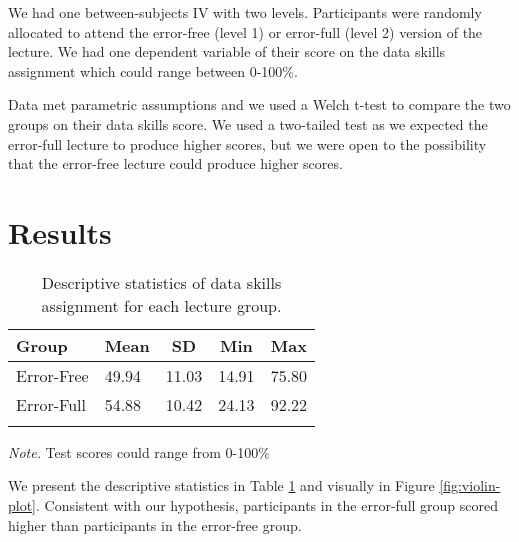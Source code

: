 \documentclass[
  man,floatsintext]{apa6}
\begin{document}
We had one between-subjects IV with two levels. Participants were randomly allocated to attend the error-free (level 1) or error-full (level 2) version of the lecture. We had one dependent variable of their score on the data skills assignment which could range between 0-100\%.

Data met parametric assumptions and we used a Welch t-test to compare the two groups on their data skills score. We used a two-tailed test as we expected the error-full lecture to produce higher scores, but we were open to the possibility that the error-free lecture could produce higher scores.

\hypertarget{results}{%
\section{Results}\label{results}}

\begin{table}[tbp]

\begin{center}
\begin{threeparttable}

\caption{\label{tab:descriptives-table}Descriptive statistics of data skills assignment for each lecture group.}

\begin{tabular}{lllll}
\toprule
Group & \multicolumn{1}{c}{Mean} & \multicolumn{1}{c}{SD} & \multicolumn{1}{c}{Min} & \multicolumn{1}{c}{Max}\\
\midrule
Error-Free & 49.94 & 11.03 & 14.91 & 75.80\\
Error-Full & 54.88 & 10.42 & 24.13 & 92.22\\
\bottomrule
\addlinespace
\end{tabular}

\begin{tablenotes}[para]
\normalsize{\textit{Note.} Test scores could range from 0-100\%}
\end{tablenotes}

\end{threeparttable}
\end{center}

\end{table}

We present the descriptive statistics in Table \ref{tab:descriptives-table} and visually in Figure \ref{fig:violin-plot}. Consistent with our hypothesis, participants in the error-full group scored higher than participants in the error-free group.
\end{document}
